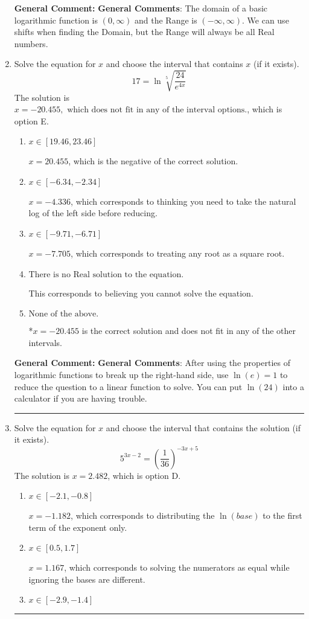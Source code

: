 \documentclass{extbook}[14pt]
\newcommand{\litem}[1]{\item #1

\rule{\textwidth}{0.4pt}}
\begin{document}
\begin{enumerate}
{\textbf{General Comment:} \textbf{General Comments}: The domain of a basic logarithmic function is $(0, \infty)$ and the Range is $(-\infty, \infty)$. We can use shifts when finding the Domain, but the Range will always be all Real numbers.
}
\litem{
 Solve the equation for $x$ and choose the interval that contains $x$ (if it exists).
\[  17 = \ln{\sqrt[5]{\frac{24}{e^{4x}}}} \]The solution is \( x = -20.455, \text{ which does not fit in any of the interval options.} \), which is option E.\begin{enumerate}[label=\Alph*.]
\item \( x \in [19.46, 23.46] \)

$x = 20.455$, which is the negative of the correct solution.
\item \( x \in [-6.34, -2.34] \)

$x = -4.336$, which corresponds to thinking you need to take the natural log of the left side before reducing.
\item \( x \in [-9.71, -6.71] \)

$x = -7.705$, which corresponds to treating any root as a square root.
\item \( \text{There is no Real solution to the equation.} \)

This corresponds to believing you cannot solve the equation.
\item \( \text{None of the above.} \)

*$x = -20.455$ is the correct solution and does not fit in any of the other intervals.
\end{enumerate}

\textbf{General Comment:} \textbf{General Comments}: After using the properties of logarithmic functions to break up the right-hand side, use $\ln(e) = 1$ to reduce the question to a linear function to solve. You can put $\ln(24)$ into a calculator if you are having trouble.
}
\litem{
Solve the equation for $x$ and choose the interval that contains the solution (if it exists).
\[ 5^{3x-2} = \left(\frac{1}{36}\right)^{-3x+5} \]The solution is \( x = 2.482 \), which is option D.\begin{enumerate}[label=\Alph*.]
\item \( x \in [-2.1, -0.8] \)

$x = -1.182$, which corresponds to distributing the $\ln(base)$ to the first term of the exponent only.
\item \( x \in [0.5, 1.7] \)

$x = 1.167$, which corresponds to solving the numerators as equal while ignoring the bases are different.
\item \( x \in [-2.9, -1.4] \)


\end{enumerate}}
\end{enumerate}
\end{document}
